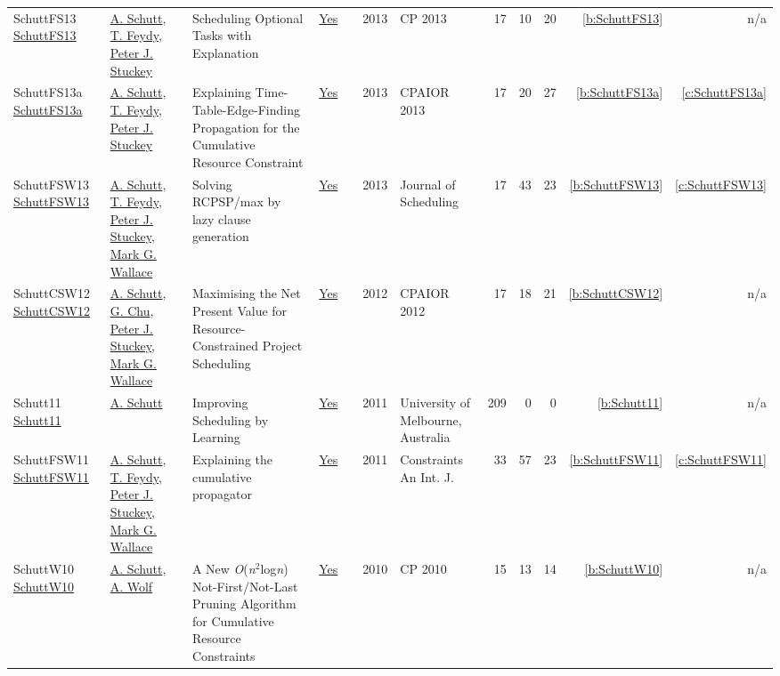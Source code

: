 {\begin{longtable}{>{\raggedright\arraybackslash}p{3cm}>{\raggedright\arraybackslash}p{6cm}>{\raggedright\arraybackslash}p{6.5cm}rrrp{2.5cm}rrrrr}
SchuttFS13 \href{https://doi.org/10.1007/978-3-642-40627-0_47}{SchuttFS13} & \hyperref[auth:a125]{A. Schutt}, \hyperref[auth:a155]{T. Feydy}, \hyperref[auth:a126]{Peter J. Stuckey} & Scheduling Optional Tasks with Explanation & \href{../works/SchuttFS13.pdf}{Yes} & \cite{SchuttFS13} & 2013 & CP 2013 & 17 & 10 & 20 & \ref{b:SchuttFS13} & n/a\\
SchuttFS13a \href{https://doi.org/10.1007/978-3-642-38171-3_16}{SchuttFS13a} & \hyperref[auth:a125]{A. Schutt}, \hyperref[auth:a155]{T. Feydy}, \hyperref[auth:a126]{Peter J. Stuckey} & Explaining Time-Table-Edge-Finding Propagation for the Cumulative Resource Constraint & \href{../works/SchuttFS13a.pdf}{Yes} & \cite{SchuttFS13a} & 2013 & CPAIOR 2013 & 17 & 20 & 27 & \ref{b:SchuttFS13a} & \ref{c:SchuttFS13a}\\
SchuttFSW13 \href{https://doi.org/10.1007/s10951-012-0285-x}{SchuttFSW13} & \hyperref[auth:a125]{A. Schutt}, \hyperref[auth:a155]{T. Feydy}, \hyperref[auth:a126]{Peter J. Stuckey}, \hyperref[auth:a117]{Mark G. Wallace} & Solving RCPSP/max by lazy clause generation & \href{../works/SchuttFSW13.pdf}{Yes} & \cite{SchuttFSW13} & 2013 & Journal of Scheduling & 17 & 43 & 23 & \ref{b:SchuttFSW13} & \ref{c:SchuttFSW13}\\
SchuttCSW12 \href{https://doi.org/10.1007/978-3-642-29828-8_24}{SchuttCSW12} & \hyperref[auth:a125]{A. Schutt}, \hyperref[auth:a346]{G. Chu}, \hyperref[auth:a126]{Peter J. Stuckey}, \hyperref[auth:a117]{Mark G. Wallace} & Maximising the Net Present Value for Resource-Constrained Project Scheduling & \href{../works/SchuttCSW12.pdf}{Yes} & \cite{SchuttCSW12} & 2012 & CPAIOR 2012 & 17 & 18 & 21 & \ref{b:SchuttCSW12} & n/a\\
Schutt11 \href{https://www.a4cp.org/sites/default/files/andreas_schutt_-_improving_scheduling_by_learning.pdf}{Schutt11} & \hyperref[auth:a125]{A. Schutt} & Improving Scheduling by Learning & \href{../works/Schutt11.pdf}{Yes} & \cite{Schutt11} & 2011 & University of Melbourne, Australia & 209 & 0 & 0 & \ref{b:Schutt11} & n/a\\
SchuttFSW11 \href{https://doi.org/10.1007/s10601-010-9103-2}{SchuttFSW11} & \hyperref[auth:a125]{A. Schutt}, \hyperref[auth:a155]{T. Feydy}, \hyperref[auth:a126]{Peter J. Stuckey}, \hyperref[auth:a117]{Mark G. Wallace} & Explaining the cumulative propagator & \href{../works/SchuttFSW11.pdf}{Yes} & \cite{SchuttFSW11} & 2011 & Constraints An Int. J. & 33 & 57 & 23 & \ref{b:SchuttFSW11} & \ref{c:SchuttFSW11}\\
SchuttW10 \href{https://doi.org/10.1007/978-3-642-15396-9_36}{SchuttW10} & \hyperref[auth:a125]{A. Schutt}, \hyperref[auth:a51]{A. Wolf} & A New \emph{O}(\emph{n}\({}^{\mbox{2}}\)log\emph{n}) Not-First/Not-Last Pruning Algorithm for Cumulative Resource Constraints & \href{../works/SchuttW10.pdf}{Yes} & \cite{SchuttW10} & 2010 & CP 2010 & 15 & 13 & 14 & \ref{b:SchuttW10} & n/a\\

\end{longtable}}

